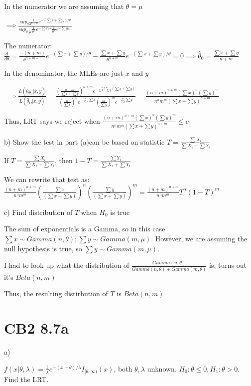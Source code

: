 \documentclass{article}
\let\Oldsum=\sum
\renewcommand{\sum}{\Oldsum\limits}
\begin{document}
In the numerator we are assuming that $\theta = \mu$

$\implies \frac{sup_{\theta}\frac{1}{\theta^{n+m}}e^{-(\sum x + \sum y)/ \theta}}{sup_{\theta, \mu}\frac{1}{\theta^n}e^{-\sum x / \theta}\frac{1}{\mu^n}e^{-\sum y/\mu}}$

The numerator: $\frac{d}{d\theta} = \frac{-(n+m)}{\theta^{n+m+1}}e^{-(\sum x + \sum y)/\theta} - \frac{\sum x + \sum y}{\theta^{n+m}}e^{-(\sum x + \sum y)/ \theta} = 0 \implies \hat{\theta}_0 = \frac{\sum x + \sum y}{n+m}$

In the denominator, the MLEs are just $\bar{x}$ and $\bar{y}$

$\implies \frac{L(\hat{\theta}_{\Theta_0} | x, y)}{L(\hat{\theta}_{\Theta}|x,y)} = \frac{(\frac{n + m}{\sum x + \sum y})^{n+m}e^{-\frac{n+m}{\sum x + \sum y}(\sum x + \sum y)}}{(\frac{n}{\sum x})^n e^{-\frac{n}{\sum x}\sum x}(\frac{m}{\sum y})^m e^{-\frac{m}{\sum y}\sum y}} = \frac{(n+m)^{n+m} (\sum x)^n (\sum y)^m}{n^n m^m (\sum x + \sum y)^{n+m}}$

Thus, LRT says we reject when $\frac{(n+m)^{n+m} (\sum x)^n (\sum y)^m}{n^n m^m (\sum x + \sum y)^{n+m}} \le c$

b) Show the test in part (a)can be based on statistic $T = \frac{\sum X_i}{\sum X_i + \sum Y_i}$

If $T = \frac{\sum X_i}{\sum X_i + \sum Y_i}$, then $1 - T = \frac{\sum Y_i}{\sum X_i + \sum Y_i}$

We can rewrite that test as: $\frac{(n+m)^{n+m}}{n^n m^m}(\frac{\sum x}{(\sum x + \sum y)})^n(\frac{\sum y}{(\sum x + \sum y)})^m = \frac{(n+m)^{n+m}}{n^n m^m} T^n (1-T)^m$

c) Find distribution of $T$ when $H_0$ is true

The sum of exponentials is a Gamma, so in this case $\sum x \sim Gamma(n, \theta); \sum y \sim Gamma(m, \mu)$. However, we are assuming the null hypothesis is true, so $\sum y \sim Gamma(m, \mu)$.

I had to look up what the distribution of $\frac{Gamma(n, \theta)}{Gamma(n, \theta) + Gamma(m, \theta)}$ is, turns out it's $Beta(n, m)$

Thus, the resulting distirbution of $T$ is $Beta(n,m)$

\section{CB2 8.7a}

a) 

$f(x|\theta, \lambda) = \frac{1}{\lambda} e^{-(x-\theta)/\lambda} I_{[\theta, \infty)}(x)$, both $\theta, \lambda$ unknown. $H_0: \theta \le 0, H_1: \theta > 0$. Find the LRT.
\end{document}
